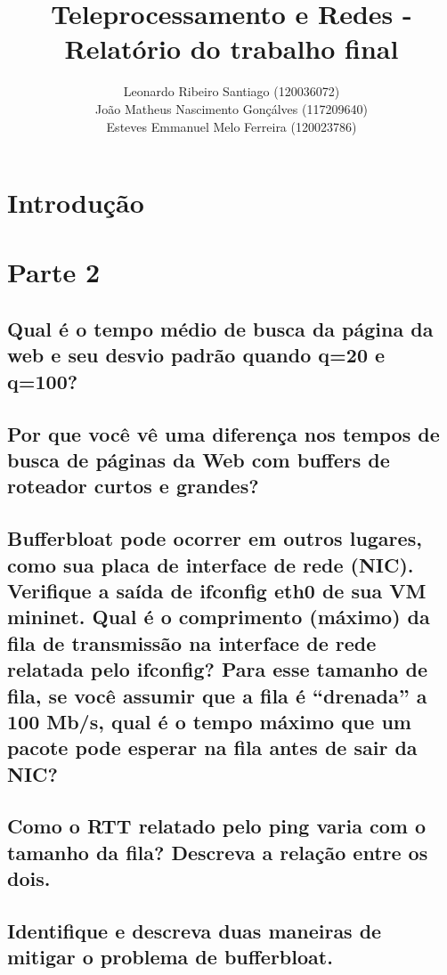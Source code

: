 \documentclass[a4paper,12pt]{article}
\title{Teleprocessamento e Redes - Relatório do trabalho final}
\author{
  Leonardo Ribeiro Santiago (120036072) \\
  João Matheus Nascimento Gonçálves (117209640) \\
  Esteves Emmanuel Melo Ferreira (120023786) }
\date{}
\begin{document}
\maketitle

\section{Introdução}

\section{Parte 2}

\subsection{Qual é o tempo médio de busca da página da web e seu desvio padrão quando q=20 e q=100?}

\subsection{Por que você vê uma diferença nos tempos de busca de páginas da Web com buffers de roteador curtos e grandes?}

\subsection{Bufferbloat pode ocorrer em outros lugares, como sua placa de interface de rede (NIC). Verifique a saída de ifconfig eth0 de sua VM mininet. Qual é o comprimento (máximo) da fila de transmissão na interface de rede relatada pelo ifconfig? Para esse tamanho de fila, se você assumir que a fila é “drenada” a 100 Mb/s, qual é o tempo máximo que um pacote pode esperar na fila antes de sair da NIC?
}

\subsection{Como o RTT relatado pelo ping varia com o tamanho da fila? Descreva a relação entre os dois.}

\subsection{Identifique e descreva duas maneiras de mitigar o problema de bufferbloat.}

\end{document}
